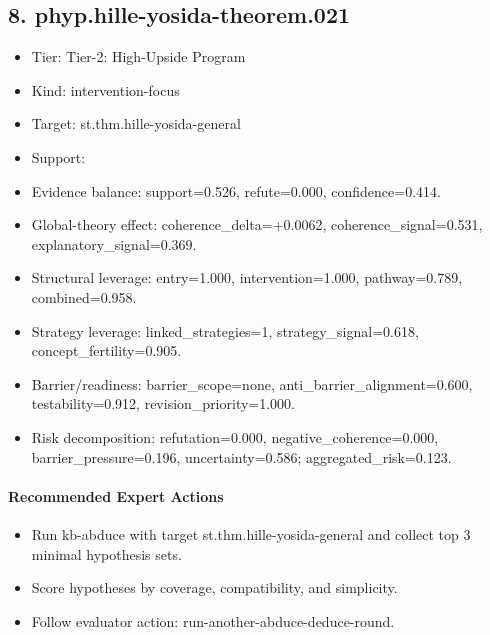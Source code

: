 \documentclass[11pt]{article}
\begin{document}
\subsection*{8. phyp.hille-yosida-theorem.021}
\begin{itemize}
\item Tier: Tier-2: High-Upside Program
\item Kind: intervention-focus
\item Target: st.thm.hille-yosida-general
\item Support: 
\item Evidence balance: support=0.526, refute=0.000, confidence=0.414.
\item Global-theory effect: coherence\_delta=+0.0062, coherence\_signal=0.531, explanatory\_signal=0.369.
\item Structural leverage: entry=1.000, intervention=1.000, pathway=0.789, combined=0.958.
\item Strategy leverage: linked\_strategies=1, strategy\_signal=0.618, concept\_fertility=0.905.
\item Barrier/readiness: barrier\_scope=none, anti\_barrier\_alignment=0.600, testability=0.912, revision\_priority=1.000.
\item Risk decomposition: refutation=0.000, negative\_coherence=0.000, barrier\_pressure=0.196, uncertainty=0.586; aggregated\_risk=0.123.
\end{itemize}
\paragraph{Recommended Expert Actions}
\begin{itemize}
\item Run kb-abduce with target st.thm.hille-yosida-general and collect top 3 minimal hypothesis sets.
\item Score hypotheses by coverage, compatibility, and simplicity.
\item Follow evaluator action: run-another-abduce-deduce-round.
\end{itemize}
\end{document}
